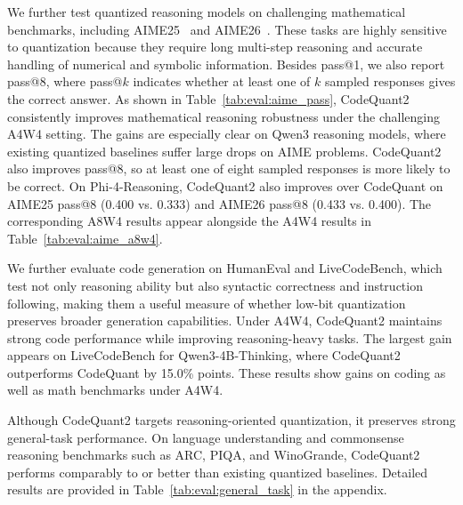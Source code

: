 \documentclass{article}
\begin{document}
We further test quantized reasoning models on challenging mathematical benchmarks, including AIME25~\citep{aime25} and AIME26~\citep{aime26}. These tasks are highly sensitive to quantization because they require long multi-step reasoning and accurate handling of numerical and symbolic information. Besides pass@1, we also report pass@8, where pass@$k$ indicates whether at least one of $k$ sampled responses gives the correct answer.
As shown in Table~\ref{tab:eval:aime_pass}, CodeQuant2 consistently improves mathematical reasoning robustness under the challenging A4W4 setting. The gains are especially clear on Qwen3 reasoning models, where existing quantized baselines suffer large drops on AIME problems. CodeQuant2 also improves pass@8, so at least one of eight sampled responses is more likely to be correct. On Phi-4-Reasoning, CodeQuant2 also improves over CodeQuant on AIME25 pass@8 (0.400 vs. 0.333) and AIME26 pass@8 (0.433 vs. 0.400). The corresponding A8W4 results appear alongside the A4W4 results in Table~\ref{tab:eval:aime_a8w4}.

We further evaluate code generation on HumanEval and LiveCodeBench, which test not only reasoning ability but also syntactic correctness and instruction following, making them a useful measure of whether low-bit quantization preserves broader generation capabilities. Under A4W4, CodeQuant2 maintains strong code performance while improving reasoning-heavy tasks. The largest gain appears on LiveCodeBench for Qwen3-4B-Thinking, where CodeQuant2 outperforms CodeQuant by 15.0\% points. These results show gains on coding as well as math benchmarks under A4W4.

Although CodeQuant2 targets reasoning-oriented quantization, it preserves strong general-task performance. On language understanding and commonsense reasoning benchmarks such as ARC, PIQA, and WinoGrande, CodeQuant2 performs comparably to or better than existing quantized baselines. Detailed results are provided in Table~\ref{tab:eval:general_task} in the appendix.


\end{document}
